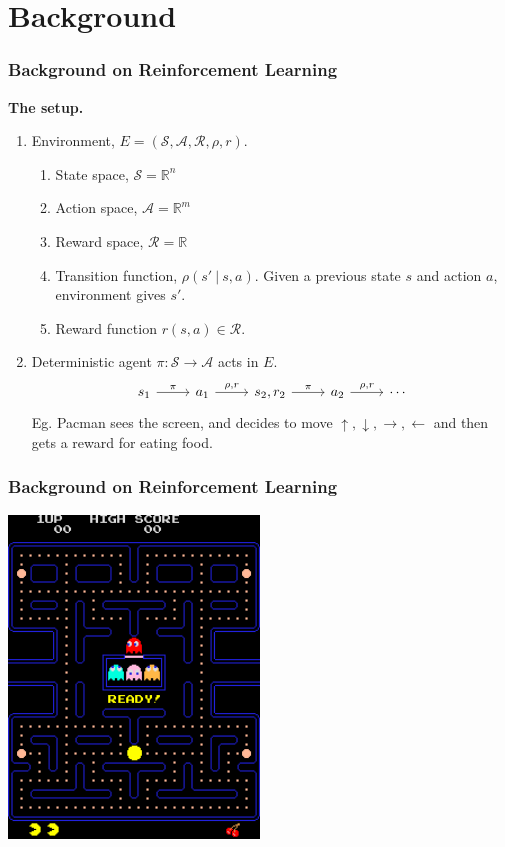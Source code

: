 \documentclass{beamer}
\numberwithin{equation}{subsection}
\numberwithin{theorem}{subsection}
\begin{document}
\section{Background}
\begin{frame}[fragile]
  \frametitle{Background on Reinforcement Learning}
  \textbf{The setup.}
  \begin{enumerate}
    \item Environment, $E = (\mathcal{S}, \mathcal{A}, \mathcal{R}, \rho, r)$. 
    \begin{enumerate}
    \item State space, $\mathcal{S} = \mathbb{R}^n$
    \item Action space, $\mathcal{A} = \mathbb{R}^m$
    \item Reward space, $\mathcal{R} = \mathbb{R}$   
    \item Transition function, $\rho(s'\ |\ s,a)$. Given a previous state $s$ and action $a$, environment gives $s'$.
    \item Reward function $r(s,a) \in \mathcal{R}$.
    \end{enumerate}
    \item Deterministic agent $\pi: \mathcal{S} \to \mathcal{A}$ acts in $E$. 
    \begin{equation*}
      \begin{tikzcd}
          s_1 \arrow{r}{\pi} & a_1 \arrow{r}{\rho, r} & s_2, r_2 \arrow{r}{\pi}& a_2  \arrow{r}{\rho, r} & \cdots
         \end{tikzcd}   
    \end{equation*}
    Eg. Pacman sees the screen, and decides to move $\uparrow, \downarrow, \rightarrow, \leftarrow$ and then gets a reward for eating food.
  \end{enumerate}
\end{frame}
\begin{frame}
\frametitle{Background on Reinforcement Learning}
  \begin{center}
    \includegraphics[width=0.5\textwidth]{Pac-man.png}
  \end{center}
\end{frame}
\end{document}
